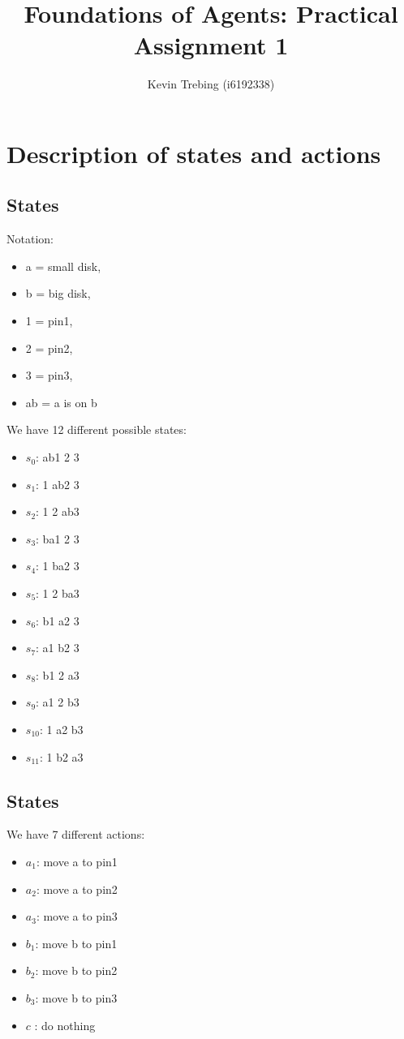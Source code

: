 \documentclass[a4paper]{article}
\title{Foundations of Agents: Practical Assignment 1}
\author{Kevin Trebing (i6192338)}
\begin{document}
\maketitle

\section{Description of states and actions}
\subsection{States}

Notation: 
\begin{itemize}

\item a = small disk, 
\item b = big disk,  
\item 1 = pin1, 
\item 2 = pin2, 
\item 3 = pin3, 
\item ab = a is on b
\end{itemize}


\noindent
We have 12 different possible states: 
\begin{itemize}
\item $s_{0}$: ab1 2 3
\item $s_{1}$: 1 ab2 3
\item $s_{2}$: 1 2 ab3
\item $s_{3}$: ba1 2 3
\item $s_{4}$: 1 ba2 3
\item $s_{5}$: 1 2 ba3
\item $s_{6}$: b1 a2 3
\item $s_{7}$: a1 b2 3
\item $s_{8}$: b1 2 a3
\item $s_{9}$: a1 2 b3
\item $s_{10}$: 1 a2 b3
\item $s_{11}$: 1 b2 a3
\end{itemize}

\subsection{States}
We have 7 different actions:
\begin{itemize}
\item $a_{1}$: move a to pin1
\item $a_{2}$: move a to pin2
\item $a_{3}$: move a to pin3
\item $b_{1}$: move b to pin1
\item $b_{2}$: move b to pin2
\item $b_{3}$: move b to pin3
\item $c$ : do nothing
\end{itemize}
\end{document}

